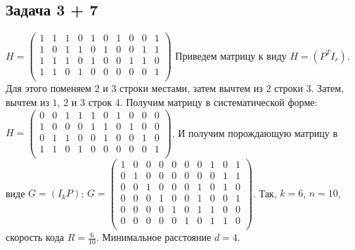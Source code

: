 \documentclass{article}
\begin{document}
\subsection{Задача 3 + 7}
$H=
\begin{pmatrix}
1 & 1 & 1 & 0 & 1 & 0 & 1 & 0 & 0 & 1 \\
1 & 0 & 1 & 1 & 0 & 1 & 0 & 0 & 1 & 1 \\
1 & 1 & 1 & 0 & 1 & 0 & 0 & 1 & 1 & 0 \\
1 & 1 & 0 & 1 & 0 & 0 & 0 & 0 & 0 & 1 \\
\end{pmatrix}$
%
Приведем матрицу к виду $H=(P^{T} I_{r})$. Для этого поменяем $2$ и $3$ строки местами, затем вычтем из $2$ строки $3$. Затем, вычтем из $1$, $2$ и $3$ строк $4$. Получим матрицу в систематической форме:
$H=
\begin{pmatrix}
0 &	0 & 1 & 1 & 1 & 0 & 1 & 0 & 0 & 0 \\	
1 & 0 & 0 & 0 & 1 & 1 & 0 & 1 & 0 & 0 \\
0 & 1 & 1 & 0 & 0 & 1 & 0 & 0 & 1 & 0 \\
1 & 1 & 0 & 1 & 0 & 0 & 0 & 0 & 0 & 1 \\
\end{pmatrix}$. 
И получим порождающую матрицу в виде $G=(I_{k} P)$:
$G=
\begin{pmatrix}
1 &	0 &	0 &	0 &	0 &	0 &	0 &	1 &	0 &	1 \\
0 &	1 &	0 &	0 &	0 &	0 &	0 &	0 &	1 &	1 \\	
0 &	0 &	1 &	0 &	0 &	0 &	1 &	0 &	1 &	0 \\	
0 &	0 &	0 &	1 &	0 &	0 &	1 &	0 &	0 &	1 \\	
0 &	0 &	0 &	0 &	1 &	0 &	1 &	1 &	0 &	0 \\	
0 &	0 &	0 &	0 &	0 &	1 &	0 &	1 &	1 &	0 \\
\end{pmatrix}$. 
Так, $k=6$, $n=10$, скорость кода $R=\frac{6}{10}$. Минимальное расстояние $d=4$.
\end{document}
